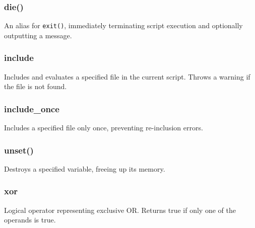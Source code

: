 \documentclass{report}
\begin{document}
\subsubsection{die()}
\bigbreak \noindent 
An alias for \texttt{exit()}, immediately terminating script execution and optionally outputting a message.

\bigbreak \noindent 
\subsubsection{include}
\bigbreak \noindent 
Includes and evaluates a specified file in the current script. Throws a warning if the file is not found.

\bigbreak \noindent 
\subsubsection{include\_once}
\bigbreak \noindent 
Includes a specified file only once, preventing re-inclusion errors.

\bigbreak \noindent 
\subsubsection{unset()}
\bigbreak \noindent 
Destroys a specified variable, freeing up its memory.

\bigbreak \noindent 
\subsubsection{xor}
\bigbreak \noindent 
Logical operator representing exclusive OR. Returns true if only one of the operands is true.
\end{document}
